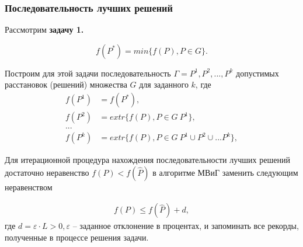 \begin{frame}
    \frametitle{Последовательность лучших решений}
    \fontsize{8pt}{7.2}\selectfont
    Рассмотрим \textbf{задачу 1.}

    \begin{displaymath}
        f(P^*) = min \{f(P), P \in G \}.
    \end{displaymath}

    Построим для этой задачи последовательность $\Gamma = P^1, P^2, ... ,P^k$ допустимых расстановок (решений) множества $G$ для заданного $k$, где 
    \begin{align}
        f(P^1) &= f(P^*), \nonumber  \\
        f(P^2) &= extr\{ f(P), P \in G \ P^1 \}, \nonumber \\
        ... \nonumber \\
        f(P^k) &= extr\{ f(P), P \in G \ P^1 \cup P^2 \cup ... P^k \}, \nonumber 
    \end{align} 
    
    Для итерационной процедура нахождения последовательности лучших решений достаточно неравенство $f(P) < f(\widehat{P})$ в алгоритме МВиГ заменить следующим неравенством 

    \begin{align}
        \label{eq:part4_is_less_than_record_d}
        f(P) \leqslant f(\widehat{P}) + d,
    \end{align}
    где $d = \varepsilon \cdot L > 0, \varepsilon$ -- заданное отклонение в процентах, и запоминать все рекорды, полученные в процессе решения задачи.

\end{frame}

